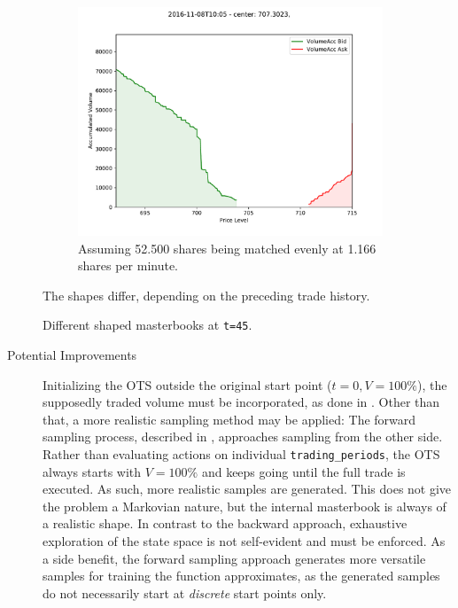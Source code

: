 \begin{figure}[ht]
\begin{subfigure}[t]{0.3\textwidth}
    	\end{subfigure}%
	\begin{subfigure}[t]{0.3\textwidth}
        		\centering
        		\includegraphics[width=\textwidth]{content/drawings/masterbook_customstart_SimEqual}
        		\caption{Assuming 52.500 shares being matched evenly at 1.166 shares per minute.}
		\label{fig:differingmasterbooks:SimEq}
    	\end{subfigure}%

	\caption{Different shaped masterbooks at \lstinline!t=45!.}
	The shapes differ, depending on the preceding trade history.
	\label{fig:differingmasterbooks}
\end{figure}

\begin{description}
\item[Potential Improvements] Initializing the \ac{OTS} outside the original start point ($t=0, V=100\%$), the supposedly traded volume must be incorporated, \eg as done in . Other than that, a more realistic sampling method may be applied: The forward sampling process, described in , approaches sampling from the other side. Rather than evaluating actions on individual \lstinline!trading_periods!, the \ac{OTS} always starts with $V=100 \% $ and keeps going until the full trade is executed. As such, more realistic samples are generated. This does not give the problem a Markovian nature, but the internal masterbook is always of a realistic shape. In contrast to the backward approach, exhaustive exploration of the state space is not self-evident and must be enforced.
As a side benefit, the forward sampling approach generates more versatile samples for training the function approximates, as the generated samples do not necessarily start at \emph{discrete} start points only.
\end{description}



